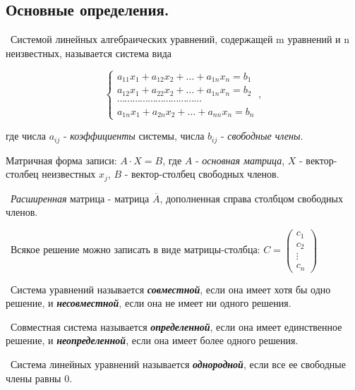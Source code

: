 \subsection*{Основные определения.}

\noindent \textasteriskcentered~Системой линейных алгебраических уравнений, содержащей m уравнений и n неизвестных, называется система вида

\begin{equation*}
    \begin{cases}
        a_{11} x_1 + a_{12} x_2 + \dots + a_{1n} x_n = b_1 \\
        a_{12} x_1 + a_{22} x_2 + \dots + a_{1n} x_n = b_2 \\
        \cdots \cdots \cdots \cdots \cdots \cdots \cdots \cdots \cdots \cdots \cdots \\
        a_{1n} x_1 + a_{2n} x_2 + \dots + a_{nn} x_n = b_n   
    \end{cases},
\end{equation*}

\noindent где числа $a_{ij}$ - \textit{коэффициенты} системы, числа $b_{ij}$ - \textit{свободные члены}.

\smallskip
\noindent Матричная форма записи: $A \cdot X = B$, где $A$ - \textit{основная матрица}, $X$ - вектор-столбец неизвестных $x_j$, $B$ - вектор-столбец свободных членов.

\smallskip
\noindent \textasteriskcentered~\textit{Расширенная} матрица - матрица $\overline{A}$, дополненная справа столбцом свободных членов.

\noindent \textbullet~Всякое решение можно записать в виде матрицы-столбца:
$
    C = 
    \begin{pmatrix}
        c_1 \\
        c_2 \\
        \vdots \\
        c_n
    \end{pmatrix}
$

\medskip\noindent \textasteriskcentered~Система уравнений называется \textbf{\textit{совместной}}, если она имеет хотя бы одно решение, и \textbf{\textit{несовместной}}, если она не имеет ни одного решения. 

\medskip\noindent \textasteriskcentered~Совместная система называется \textbf{\textit{определенной}}, если она имеет единственное решение, и \textbf{\textit{неопределенной}}, если она имеет более одного решения. 

\medskip\noindent \textasteriskcentered~Система линейных уравнений называется \textbf{\textit{однородной}}, если все ее свободные члены равны 0. 

